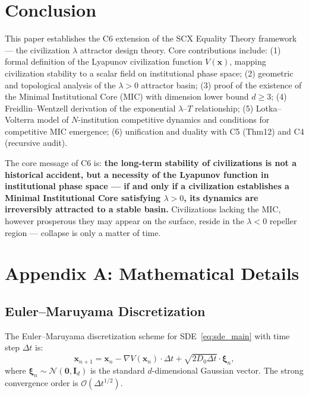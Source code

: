 \documentclass[12pt,a4paper]{article}
\theoremstyle{definition}
\newcommand{\SCX}{\textsf{SCX}}
\newcommand{\eqtheory}{Equality Theory}
\newcommand{\calO}{\mathcal{O}}
\newcommand{\lb}{\lambda}
\newcommand{\Lyap}{V}
\newcommand{\grad}{\nabla}
\begin{document}
\section{Conclusion}
\label{sec:conclusion}

\noindent
This paper establishes the C6 extension of the \SCX{} \eqtheory{} framework --- the civilization $\lb$ attractor design theory. Core contributions include: (1) formal definition of the Lyapunov civilization function $\Lyap(\mathbf{x})$, mapping civilization stability to a scalar field on institutional phase space; (2) geometric and topological analysis of the $\lb>0$ attractor basin; (3) proof of the existence of the Minimal Institutional Core (MIC) with dimension lower bound $d \geq 3$; (4) Freidlin--Wentzell derivation of the exponential $\lb$--$T$ relationship; (5) Lotka--Volterra model of $N$-institution competitive dynamics and conditions for competitive MIC emergence; (6) unification and duality with C5 (Thm12) and C4 (recursive audit).

The core message of C6 is: \textbf{the long-term stability of civilizations is not a historical accident, but a necessity of the Lyapunov function in institutional phase space --- if and only if a civilization establishes a Minimal Institutional Core satisfying $\lb>0$, its dynamics are irreversibly attracted to a stable basin.} Civilizations lacking the MIC, however prosperous they may appear on the surface, reside in the $\lb<0$ repeller region --- collapse is only a matter of time.

\newpage
\appendix

\section{Appendix A: Mathematical Details}
\label{app:math}

\subsection{Euler--Maruyama Discretization}
\label{app:em}

The Euler--Maruyama discretization scheme for SDE~\eqref{eq:sde_main} with time step $\Delta t$ is:
\begin{equation}\label{eq:em}
    \mathbf{x}_{n+1} = \mathbf{x}_n - \grad \Lyap(\mathbf{x}_n) \cdot \Delta t + \sqrt{2 D_0 \Delta t} \cdot \bm{\xi}_n,
\end{equation}
where $\bm{\xi}_n \sim \mathcal{N}(\mathbf{0}, \mathbf{I}_d)$ is the standard $d$-dimensional Gaussian vector. The strong convergence order is $\calO(\Delta t^{1/2})$.
\end{document}
